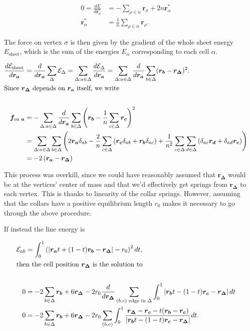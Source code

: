 \begin{align*}
    0 = \frac{dE}{d\bm{r}^*_\alpha} &= -\sum_{\rho\in\alpha} \bm{r}_\sigma + 2n\bm{r}^*_\alpha \\
    \bm{r}^*_\alpha &= \frac{1}{n} \sum_{\rho\in\alpha} \bm{r}_\rho.
\end{align*}

The force on vertex $\sigma$ is then given by the gradient of the whole sheet energy $E_{\text{sheet}}$, which is the sum of the energies $E_\alpha$ corresponding to each cell $\alpha$. 

\begin{align*}
    \frac{d \mathcal{E}_{\text{sheet}}}{d\bm{r_a}} &= \frac{d}{d\bm{r_a}} \sum_\Delta \mathcal{E}_\Delta = \sum_{\Delta:a \in \Delta} \frac{d\mathcal{E}_\Delta}{d\bm{r_a}} = \sum_{\Delta:a\in\Delta} \frac{d}{d\bm{r_a}} \sum_{b \in \Delta} (\bm{r_b} - \bm{r_\Delta})^2. \\
    \intertext{Since $\bm{r_\Delta}$ depends on $\bm{r_a}$ itself, we write} \\
    \bm{f_{\text{on }a}} &= -\sum_{\Delta:a\in\Delta} \frac{d}{d\bm{r_a}} \sum_{b \in \Delta} \left(\bm{r_b} - \frac{1}{n} \sum_{c\in\Delta} \bm{r_c} \right)^2 \\
    &= \sum_{\Delta:a\in\Delta} \sum_{b \in \Delta} \left(2\bm{r_a}\delta_{ab} - \frac{2}{n} \sum_{c\in\Delta}\left(\bm{r_c}\delta_{ab} + \bm{r_b}\delta_{ac}\right) + \frac{1}{n^2} \sum_{c\in\Delta}\sum_{d\in\Delta} \left(\delta_{ac}\bm{r_d} + \delta_{ad}\bm{r_c} \right) \right) \\
    &= -2\left(\bm{r_a} - \bm{r_\Delta} \right)
\end{align*}

This process was overkill, since we could have reasonably assumed that $\bm{r_\Delta}$ would be at the vertices' center of mass and that we'd effectively get springs from $\bm{r_\Delta}$ to each vertex. 
This is thanks to linearity of the collar springs. 
However, assuming that the collars have a positive equilibrium length $r_0$ makes it necessary to go through the above procedure.

If instead the line energy is 

\begin{align*}
    \mathcal{E}_{ab} &= \int_0^1 \left(\left|\bm{r_a}t + (1-t)\bm{r_b} - \bm{r_\Delta}\right| - r_0 \right)^2 dt, \\
    \intertext{then the cell position $\bm{r_\Delta}$ is the solution to} \\
    0 &= -2 \sum_{b\in\Delta} \bm{r_b} + 6 \bm{r_\Delta} - 2r_0 \frac{d}{d\bm{r_\Delta}} \sum_{(b,c) \text{ edge in }\Delta} \int_0^1 \left| \bm{r_b}t - (1-t)\bm{r_c} - \bm{r_\Delta} \right| dt \\
    0 &= -2 \sum_{b\in\Delta} \bm{r_b} + 6 \bm{r_\Delta} - 2r_0 \sum_{(b,c)} \int_0^1 \frac{\bm{r_\Delta} - \bm{r_c} - t(\bm{r_b} - \bm{r_c})}{\left|\bm{r_b}t - (1-t)\bm{r_c} - \bm{r_\Delta} \right|} dt.
\end{align*}


